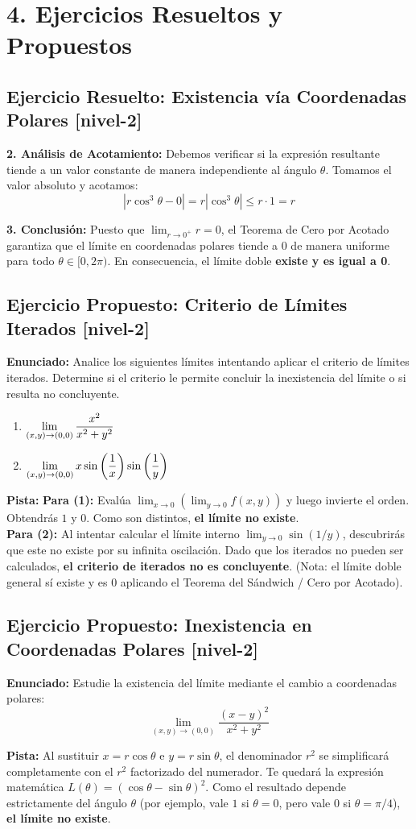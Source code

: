 \documentclass[11pt]{article}
\newenvironment{ejercicios}{%
  \section*{4. Ejercicios Resueltos y Propuestos}%
}{}
\newenvironment{ejercicioresuelto}[2]{\subsection*{Ejercicio Resuelto: #1 \small{[#2]}}}{}
\newenvironment{ejerciciopropuesto}[2]{\subsection*{Ejercicio Propuesto: #1 \small{[#2]}}}{}
\newcommand{\enunciado}[1]{\textbf{Enunciado:} #1\par\vspace{0.2cm}}
\newcommand{\pista}[1]{\textbf{Pista:} #1\par\vspace{0.4cm}}
\begin{document}
\begin{ejercicios}
\begin{ejercicioresuelto}{Existencia vía Coordenadas Polares}{nivel-2}
{      \textbf{2. Análisis de Acotamiento:}
      Debemos verificar si la expresión resultante tiende a un valor constante de manera independiente al ángulo $\theta$.
      Tomamos el valor absoluto y acotamos:
      $$ |r\cos^3\theta - 0| = r|\cos^3\theta| \leq r \cdot 1 = r $$
      
      \textbf{3. Conclusión:}
      Puesto que $\displaystyle\lim_{r \to 0^+} r = 0$, el Teorema de Cero por Acotado garantiza que el límite en coordenadas polares tiende a $0$ de manera uniforme para todo $\theta \in [0, 2\pi)$. En consecuencia, el límite doble \textbf{existe y es igual a 0}.
    }
  \end{ejercicioresuelto}

  \begin{ejerciciopropuesto}{Criterio de Límites Iterados}{nivel-2}
    \enunciado{
      Analice los siguientes límites intentando aplicar el criterio de límites iterados. Determine si el criterio le permite concluir la inexistencia del límite o si resulta no concluyente.
      \begin{enumerate}
        \item $\displaystyle \displaystyle\lim_{(x,y) \to (0,0)} \dfrac{x^2}{x^2 + y^2}$
        \item $\displaystyle \displaystyle\lim_{(x,y) \to (0,0)} x\sin\left(\dfrac{1}{x}\right)\sin\left(\dfrac{1}{y}\right)$
      \end{enumerate}
    }
    \pista{
      \textbf{Para (1):} Evalúa $\displaystyle\lim_{x\to 0}(\displaystyle\lim_{y\to 0} f(x,y))$ y luego invierte el orden. Obtendrás $1$ y $0$. Como son distintos, \textbf{el límite no existe}. \\
      \textbf{Para (2):} Al intentar calcular el límite interno $\displaystyle\lim_{y\to 0} \sin(1/y)$, descubrirás que este no existe por su infinita oscilación. Dado que los iterados no pueden ser calculados, \textbf{el criterio de iterados no es concluyente}. (Nota: el límite doble general sí existe y es $0$ aplicando el Teorema del Sándwich / Cero por Acotado).
    }
  \end{ejerciciopropuesto}

  \begin{ejerciciopropuesto}{Inexistencia en Coordenadas Polares}{nivel-2}
    \enunciado{
      Estudie la existencia del límite mediante el cambio a coordenadas polares:
      $$ \displaystyle\lim_{(x,y) \to (0,0)} \dfrac{(x-y)^2}{x^2 + y^2} $$
    }
    \pista{
      Al sustituir $x = r\cos\theta$ e $y = r\sin\theta$, el denominador $r^2$ se simplificará completamente con el $r^2$ factorizado del numerador. Te quedará la expresión matemática $L(\theta) = (\cos\theta - \sin\theta)^2$. Como el resultado depende estrictamente del ángulo $\theta$ (por ejemplo, vale $1$ si $\theta = 0$, pero vale $0$ si $\theta = \pi/4$), \textbf{el límite no existe}.
    }
  \end{ejerciciopropuesto}


\end{ejercicios}
\end{document}
